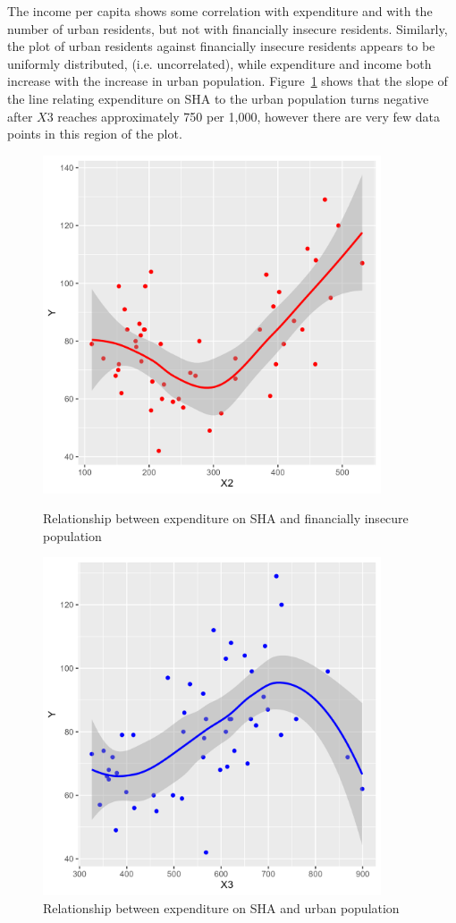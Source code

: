 \documentclass[12pt,letterpaper]{article}
\begin{document}
\begin{itemize}
		The income per capita shows some correlation with expenditure and with the number of
		urban residents, but not with financially insecure residents.  Similarly, the plot of
		urban residents against financially insecure residents appears to be uniformly distributed,
		(i.e. uncorrelated), while expenditure and income both increase with the increase in urban
		population.  
		Figure~\ref{y_x3} shows that the slope of the line relating expenditure on SHA to the urban
		population turns negative after $X3$ reaches approximately 750 per 1,000, however there are
		very few data points in this region of the plot.

		\begin{figure}
		  \includegraphics[width=10cm]{y_x2.png}
		  \caption{Relationship between expenditure on SHA and financially insecure 
		  population }\label{y_x2}
		  \includegraphics[width=10cm]{y_x3.png}
		  \caption{Relationship between expenditure on SHA and urban population }\label{y_x3}
		\end{figure}
		

\end{itemize}
\end{document}
